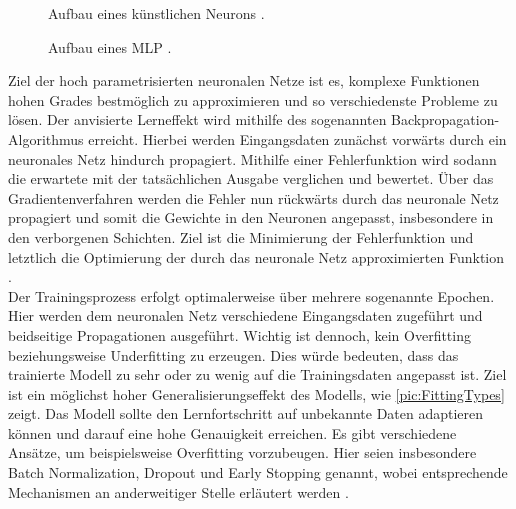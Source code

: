 \begin{figure}[h!]
  \centering
  \caption{Aufbau eines künstlichen Neurons \cite{MCC20}.}
  \label{pic:ArtificialNeuron}
\end{figure}

\begin{figure}[h!]
  \centering
  \caption{Aufbau eines MLP \cite[S.~133]{ZHA20}.}
  \label{pic:MultiLayerPerceptron}
\end{figure}

\noindent
Ziel der hoch parametrisierten neuronalen Netze ist es, komplexe Funktionen hohen Grades bestmöglich zu approximieren und so verschiedenste Probleme zu lösen. Der anvisierte Lerneffekt wird mithilfe des sogenannten Backpropagation-Algorithmus erreicht. Hierbei werden Eingangsdaten zunächst vorwärts durch ein neuronales Netz hindurch propagiert. Mithilfe einer Fehlerfunktion wird sodann die erwartete mit der tatsächlichen Ausgabe verglichen und bewertet. Über das Gradientenverfahren werden die Fehler nun rückwärts durch das neuronale Netz propagiert und somit die Gewichte in den Neuronen angepasst, insbesondere in den verborgenen Schichten. Ziel ist die Minimierung der Fehlerfunktion und letztlich die Optimierung der durch das neuronale Netz approximierten Funktion \cite[S.~140, 169]{ZHA20}.\\

\noindent
Der Trainingsprozess erfolgt optimalerweise über mehrere sogenannte Epochen. Hier werden dem neuronalen Netz verschiedene Eingangsdaten zugeführt und beidseitige Propagationen ausgeführt. Wichtig ist dennoch, kein Overfitting beziehungsweise Underfitting zu erzeugen. Dies würde bedeuten, dass das trainierte Modell zu sehr oder zu wenig auf die Trainingsdaten angepasst ist. Ziel ist ein möglichst hoher Generalisierungseffekt des Modells, wie \autoref{pic:FittingTypes} zeigt. Das Modell sollte den Lernfortschritt auf unbekannte Daten adaptieren können und darauf eine hohe Genauigkeit erreichen. Es gibt verschiedene Ansätze, um beispielsweise Overfitting vorzubeugen. Hier seien insbesondere Batch Normalization, Dropout und Early Stopping genannt, wobei entsprechende Mechanismen an anderweitiger Stelle erläutert werden \cite[S.~143-149]{ZHA20}.

